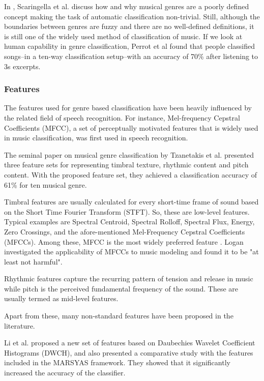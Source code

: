 In \cite{Scaringella2006}, Scaringella et al. discuss how and why musical genres are a poorly defined concept making the task of automatic classification non-trivial.
Still, although the boundaries between genres are fuzzy and there are no well-defined definitions, it is still one of the widely used method of classification of music. 
If we look at human capability in genre classification, Perrot et al \cite{Perrot1999} found that people classified songs--in a ten-way classification setup--with an accuracy of 70\% after listening to 3s excerpts.

\subsubsection{Features}
The features used for genre based classification have been heavily influenced by the related field of speech recognition. 
For instance, Mel-frequency Cepstral Coefficients (MFCC), a set of perceptually motivated features that is widely used in music classification, was first used in speech recognition.

The seminal paper on musical genre classification by Tzanetakis et al. \cite{Tzanetakis2002} presented three feature sets for representing timbral texture, rhythmic content and pitch content. 
With the proposed feature set, they achieved a classification accuracy of 61\% for ten musical genre.

Timbral features are usually calculated for every short-time frame of sound based on the Short Time Fourier Transform (STFT). 
So, these are low-level features. 
Typical examples are Spectral Centroid, Spectral Rolloff, Spectral Flux, Energy, Zero Crossings, and the afore-mentioned Mel-Frequency Cepstral Coefficients (MFCCs).
Among these, MFCC is the most widely preferred feature \cite{Lippens2004}\cite{Kour2015}. Logan \cite{Logan2000} investigated the applicability of MFCCs to music modeling and found it to be "at least not harmful".

Rhythmic features capture the recurring pattern of tension and release in music while pitch is the perceived fundamental frequency of the sound. 
These are usually termed as mid-level features.

Apart from these, many non-standard features have been proposed in the literature. 

Li et al.\cite{Li2003} proposed a new set of features based on Daubechies Wavelet Coefficient Histograms (DWCH), and also presented a comparative study with the features included in the MARSYAS framework.
They showed that it significantly increased the accuracy of the classifier.

